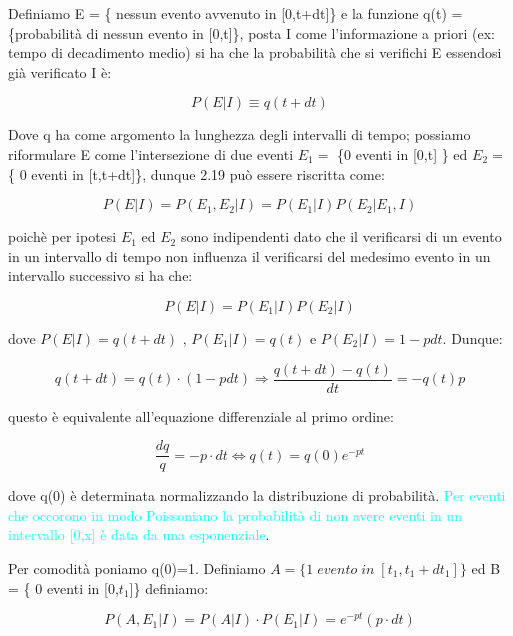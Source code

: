 \documentclass[11pt,a4paper]{book}
\begin{document}
Definiamo E = \{ nessun evento avvenuto in [0,t+dt]\} e la funzione q(t) = \{probabilit\`{a} di nessun evento in [0,t]\}, posta I come l'informazione a priori (ex: tempo di decadimento medio) si ha che la probabilit\`{a} che si verifichi E essendosi gi\`{a} verificato I \`{e}:

\begin{equation}
	P(E\vert I) \equiv q(t+dt)
\end{equation} 

Dove q ha come argomento la lunghezza degli intervalli di tempo; possiamo riformulare E come l'intersezione di due eventi $E_1 =$ \{0 eventi in [0,t] \} ed $E_2 = $ \{ 0 eventi in [t,t+dt]\}, dunque 2.19 pu\`{o} essere riscritta come:

\begin{equation*}
	P(E \vert I) = P(E_1,E_2 \vert I) = P(E_1 \vert I)P(E_2 \vert E_1 ,I)
\end{equation*}

poich\`{e} per ipotesi $E_{1}$ ed $E_{2}$ sono indipendenti dato che il verificarsi di un evento in un intervallo di tempo non influenza il verificarsi del medesimo evento in un intervallo successivo si ha che:

\begin{equation}
	P(E \vert I) = P(E_1 \vert I)P(E_2 \vert I)
\end{equation}

dove $P(E \vert I) = q(t+dt)$ , $P(E_1 \vert I) = q(t)$ e $P(E_2 \vert I) = 1-pdt$. Dunque:

\begin{equation}
	q(t+dt) = q(t)\cdot (1-pdt) \Rightarrow \dfrac{q(t+dt)-q(t)}{dt} = -q(t)p
\end{equation}

questo \`{e} equivalente all'equazione differenziale al primo ordine:

\begin{equation*}
	\dfrac{dq}{q} = -p \cdot dt \iff q(t) = q(0)e^{-pt}
\end{equation*}

dove q(0) \`{e} determinata normalizzando la distribuzione di probabilit\`{a}. \textcolor{cyan}{Per eventi che occorono in modo Poissoniano la probabilit\`{a} di non avere eventi in un intervallo [0,x] \`{e} data da una esponenziale}.

Per comodit\`{a} poniamo q(0)=1. Definiamo $A = \{ 1 \; evento \; in \; [t_1,t_1+dt_1] \}$ ed B = \{ 0 eventi in [0,$t_1$]\} definiamo:

\begin{equation}
	P(A,E_1 \vert I) = P(A \vert I) \cdot P(E_1 \vert I) = e^{-pt}(p \cdot dt)
\end{equation} 
\end{document}

